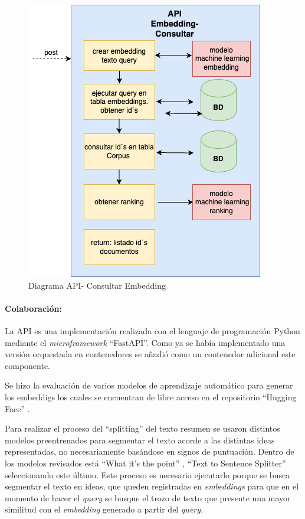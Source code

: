 \documentclass[
  12pt,
  openany]{book}
\begin{document}
\begin{enumerate}
\begin{figure}
  {\centering \includegraphics[width=0.45\linewidth]{images/05-desarrollo/5_ciclo/diagramapiconsultar} 

  }

  \caption{Diagrama API- Consultar Embedding}\label{fig:semanticoconsultar}
  \end{figure}
\end{enumerate}

\hypertarget{semancola}{%
\paragraph{Colaboración:}\label{semancola}}

La API es una implementación realizada con el lenguaje de programación Python mediante el \emph{microframework} ``FastAPI''. Como ya se había implementado una versión orquestada en contenedores se añadió como un contenedor adicional este componente.

Se hizo la evaluación de varios modelos de aprendizaje automático para generar los embeddigs los cuales se encuentran de libre acceso en el repositorio ``Hugging Face'' \citep{hfmodels2023}.

Para realizar el proceso del ``splitting'' del texto resumen se usaron distintos modelos preentrenados para segmentar el texto acorde a las distintas ideas representadas, no necesariamente basándose en signos de puntuación. Dentro de los modelos revisados está ``What it's the point'' \citep{minixhofer-etal-2023-wheres} , ``Text to Sentence Splitter'' \citep{sensplit22023} seleccionando este último. Este proceso es necesario ejecutarlo porque se busca segmentar el texto en ideas, que queden registradas en \emph{embeddings} para que en el momento de hacer el \emph{query} se busque el trozo de texto que presente una mayor similitud con el \emph{embedding} generado a partir del \emph{query}.
\end{document}
